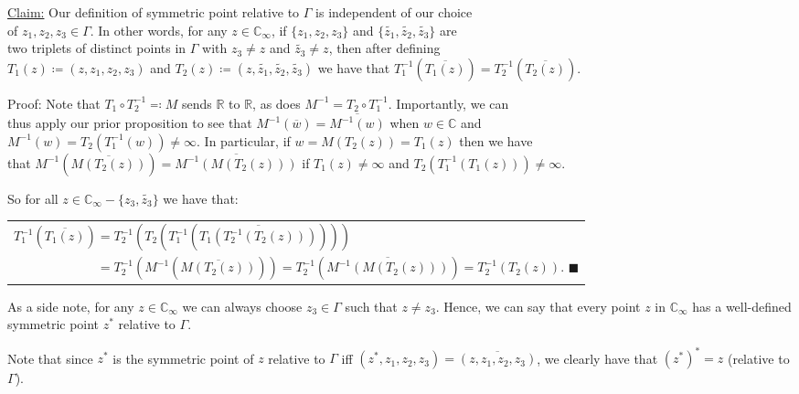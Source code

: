 \documentclass{book}
\newcommand{\hTwo}{%
\color{Black}%
   \fontsize{13}{15}\selectfont%
}
\newcommand{\myComment}{%
   \color{RawerSienna}%
   \fontsize{12}{14}\selectfont%
}
\newcommand{\exTwo}{%
   \color{Purple}%
   \fontsize{13}{15}\selectfont%
}
\newcommand{\exThreeP}{%
   \color{RedViolet}%
   \fontsize{12}{14}\selectfont%
}
\newenvironment{myIndent}{%
   \begin{adjustwidth}{2.5em}{0em}%
}{%
   \end{adjustwidth}%
}
\newenvironment{myDindent}{%
   \begin{adjustwidth}{5em}{0em}%
}{%
   \end{adjustwidth}%
}
\newcommand{\retTwo}{\hfill\bigbreak}
\begin{document}
\exTwo\ul{Claim:} Our definition of symmetric point relative to $\Gamma$ is independent of our choice\\ of $z_1, z_2, z_3 \in \Gamma$. In other words, for any $z \in \mathbb{C}_\infty$, if $\{z_1, z_2, z_3\}$ and $\{\widetilde{z_1}, \widetilde{z_2}, \widetilde{z_3}\}$ are\\ two triplets of distinct points in $\Gamma$ with $z_3 \neq z$ and $\widetilde{z_3} \neq z$, then after defining\\ $T_1(z) \coloneqq (z, z_1, z_2, z_3)$ and $T_2(z) \coloneqq (z, \widetilde{z_1}, \widetilde{z_2}, \widetilde{z_3})$ we have that $T_1^{-1}(\overline{T_1(z)}) = T_2^{-1}(\overline{T_2(z)})$.
\begin{myIndent}\exThreeP
	Proof:\newpage
	Note that $T_1 \circ T_2^{-1} \eqqcolon M$ sends $\mathbb{R}$ to $\mathbb{R}$, as does $M^{-1} = T_2 \circ T_1^{-1}$. Importantly, we can\\ thus apply our prior proposition to see that $M^{-1}(\overline{w}) = \overline{M^{-1}(w)}$ when $w \in \mathbb{C}$ and\\ [3pt] $M^{-1}(w) = T_2(T_1^{-1}(w)) \neq \infty$. In particular, if $w = M(T_2(z)) = T_1(z)$ then we have\\ [2pt] that $M^{-1}(\overline{M(T_2(z))}) = \overline{M^{-1}(M(T_2(z)))}$ if $T_1(z) \neq \infty$ and $T_2(T_1^{-1}(T_1(z))) \neq \infty$.\retTwo

	So for all $z \in \mathbb{C}_\infty - \{z_3, \widetilde{z_3}\}$ we have that:

	{\centering\begin{tabular}{l}
		$T_1^{-1}(\overline{T_1(z)}) = T_2^{-1}(T_2(T_1^{-1}(\overline{T_1(T_2^{-1}(T_2(z)))})))$\\ [6pt]
		$\phantom{T_1^{-1}(\overline{T_1(z)})} = T_2^{-1}(M^{-1}(\overline{M(T_2(z))})) = T_2^{-1}(\overline{M^{-1}(M(T_2(z)))}) = T_2^{-1}(T_2(z))$. $\blacksquare$
	\end{tabular}\retTwo\par}

	\begin{myDindent}\myComment
		As a side note, for any $z \in \mathbb{C}_\infty$ we can always choose $z_3 \in \Gamma$ such that $z \neq z_3$. Hence, we can say that every point $z$ in $\mathbb{C}_\infty$ has a well-defined symmetric point $z^*$ relative to $\Gamma$.\retTwo
	\end{myDindent}
\end{myIndent}

\hTwo Note that since $z^*$ is the symmetric point of $z$ relative to $\Gamma$ iff $(z^*, z_1, z_2, z_3) = \overline{(z, z_1, z_2, z_3)}$, we clearly have that $(z^*)^* = z$ (relative to $\Gamma$).\retTwo
\end{document}
